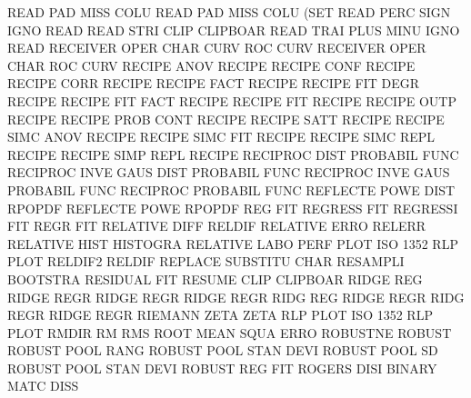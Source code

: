 READ     PAD  MISS COLU                 READ     PAD  MISS COLU (SET
READ     PERC SIGN IGNO                 READ
READ     STRI CLIP                      CLIPBOAR
READ     TRAI PLUS MINU IGNO            READ
RECEIVER OPER CHAR CURV                 ROC      CURV
RECEIVER OPER CHAR                      ROC      CURV
RECIPE   ANOV                           RECIPE
RECIPE   CONF                           RECIPE
RECIPE   CORR                           RECIPE
RECIPE   FACT                           RECIPE
RECIPE   FIT  DEGR                      RECIPE
RECIPE   FIT  FACT                      RECIPE
RECIPE   FIT                            RECIPE
RECIPE   OUTP                           RECIPE
RECIPE   PROB CONT                      RECIPE
RECIPE   SATT                           RECIPE
RECIPE   SIMC ANOV                      RECIPE
RECIPE   SIMC FIT                       RECIPE
RECIPE   SIMC REPL                      RECIPE
RECIPE   SIMP REPL                      RECIPE
RECIPROC DIST                           PROBABIL FUNC
RECIPROC INVE GAUS DIST                 PROBABIL FUNC
RECIPROC INVE GAUS                      PROBABIL FUNC
RECIPROC                                PROBABIL FUNC
REFLECTE POWE DIST                      RPOPDF
REFLECTE POWE                           RPOPDF
REG                                     FIT
REGRESS                                 FIT
REGRESSI                                FIT
REGR                                    FIT
RELATIVE DIFF                           RELDIF
RELATIVE ERRO                           RELERR
RELATIVE HIST                           HISTOGRA
RELATIVE LABO PERF PLOT                 ISO      1352 RLP  PLOT
RELDIF2                                 RELDIF
REPLACE                                 SUBSTITU CHAR
RESAMPLI                                BOOTSTRA
RESIDUAL                                FIT
RESUME   CLIP                           CLIPBOAR
RIDGE    REG                            RIDGE    REGR
RIDGE    REGR                           RIDGE    REGR
RIDG     REG                            RIDGE    REGR
RIDG     REGR                           RIDGE    REGR
RIEMANN  ZETA                           ZETA
RLP      PLOT                           ISO      1352 RLP  PLOT
RMDIR                                   RM
RMS                                     ROOT     MEAN SQUA ERRO
ROBUSTNE                                ROBUST
ROBUST   POOL RANG                      ROBUST   POOL STAN DEVI
ROBUST   POOL SD                        ROBUST   POOL STAN DEVI
ROBUST   REG                            FIT
ROGERS   DISI                           BINARY   MATC DISS
